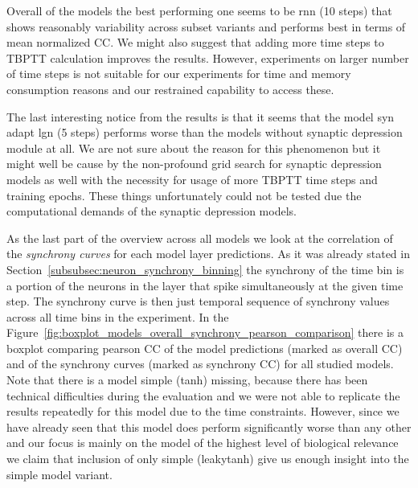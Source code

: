 Overall of the models the best performing one seems to be rnn (10 steps) that shows reasonably variability across subset variants and performs best in terms of mean normalized CC. We might also suggest that adding more time steps to TBPTT calculation improves the results. However, experiments on larger number of time steps is not suitable for our experiments for time and memory consumption reasons and our restrained capability to access these.

The last interesting notice from the results is that it seems that the model syn adapt lgn (5 steps) performs worse than the models without synaptic depression module at all. We are not sure about the reason for this phenomenon but it might well be cause by the non-profound grid search for synaptic depression models as well with the necessity for usage of more TBPTT time steps and training epochs. These things unfortunately could not be tested due the computational demands of the synaptic depression models.

As the last part of the overview across all models we look at the correlation of the \emph{synchrony curves} for each model layer predictions. As it was already stated in Section~\ref{subsubsec:neuron_synchrony_binning} the synchrony of the time bin is a portion of the neurons in the layer that spike simultaneously at the given time step. The synchrony curve is then just temporal sequence of synchrony values across all time bins in the experiment. In the Figure~\ref{fig:boxplot_models_overall_synchrony_pearson_comparison} there is a boxplot comparing pearson CC of the model predictions (marked as overall CC) and of the synchrony curves (marked as synchrony CC) for all studied models. Note that there is a model simple (tanh) missing, because there has been technical difficulties during the evaluation and we were not able to replicate the results repeatedly for this model due to the time constraints. However, since we have already seen that this model does perform significantly worse than any other and our focus is mainly on the model of the highest level of biological relevance we claim that inclusion of only simple (leakytanh) give us enough insight into the simple model variant.

